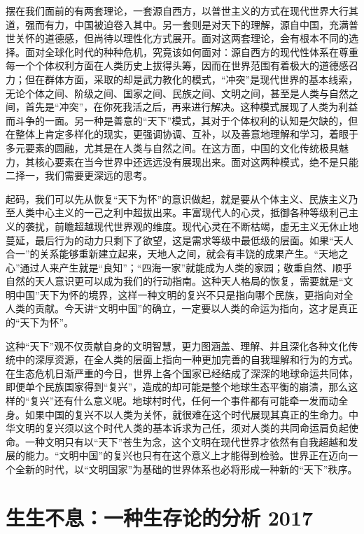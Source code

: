 \documentclass[UTF8, 12pt, a4paper]{ctexrep}
\begin{document}
摆在我们面前的有两套理论，一套源自西方，以普世主义的方式在现代世界大行其道，强而有力，中国被迫卷入其中。另一套则是对天下的理解，源自中国，充满普世关怀的道德感，但尚待以理性化方式展开。面对这两套理论，会有根本不同的选择。面对全球化时代的种种危机，究竟该如何面对：源自西方的现代性体系在尊重每一个个体权利方面在人类历史上拔得头筹，因而在世界范围有着极大的道德感召力；但在群体方面，采取的却是武力教化的模式，“冲突”是现代世界的基本线索，无论个体之间、阶级之间、国家之间、民族之间、文明之间，甚至是人类与自然之间，首先是“冲突”，在你死我活之后，再来进行解决。这种模式展现了人类为利益而斗争的一面。另一种是善意的“天下”模式，其对于个体权利的认知是欠缺的，但在整体上肯定多样化的现实，更强调协调、互补，以及善意地理解和学习，着眼于多元要素的圆融，尤其是在人类与自然之间。在这方面，中国的文化传统极具魅力，其核心要素在当今世界中还远远没有展现出来。面对这两种模式，绝不是只能二择一，我们需要更深远的思考。

起码，我们可以先从恢复“天下为怀”的意识做起，就是要从个体主义、民族主义乃至人类中心主义的一己之利中超拔出来。丰富现代人的心灵，抵御各种等级利己主义的袭扰，前瞻超越现代世界观的维度。现代心灵在不断枯竭，虚无主义无休止地蔓延，最后行为的动力只剩下了欲望，这是需求等级中最低级的层面。如果“天人合一”的关系能够重新建立起来，天地人之间，就会有丰饶的成果产生。“天地之心”通过人来产生就是“良知”；“四海一家”就能成为人类的家园；敬重自然、顺乎自然的天人意识更可以成为我们的行动指南。这种天人格局的恢复，需要就是“文明中国”天下为怀的境界，这样一种文明的复兴不只是指向哪个民族，更指向对全人类的贡献。今天讲“文明中国”的确立，一定要以人类的命运为指向，这才是真正的“天下为怀”。

这种“天下”观不仅贡献自身的文明智慧，更力图涵盖、理解、并且深化各种文化传统中的深厚资源，在全人类的层面上指向一种更加完善的自我理解和行为的方式。在生态危机日渐严重的今日，世界上各个国家已经结成了深深的地球命运共同体，即便单个民族国家得到“复兴”，造成的却可能是整个地球生态平衡的崩溃，那么这样的“复兴”还有什么意义呢。地球村时代，任何一个事件都有可能牵一发而动全身。如果中国的复兴不以人类为关怀，就很难在这个时代展现其真正的生命力。中华文明的复兴须以这个时代人类的基本诉求为己任，须对人类的共同命运肩负起使命。一种文明只有以“天下”苍生为念，这个文明在现代世界才依然有自我超越和发展的能力。“文明中国”的复兴也只有在这个意义上才能得到检验。世界正在迈向一个全新的时代，以“文明国家”为基础的世界体系也必将形成一种新的“天下”秩序。

\section{生生不息：一种生存论的分析 2017}
\end{document}
